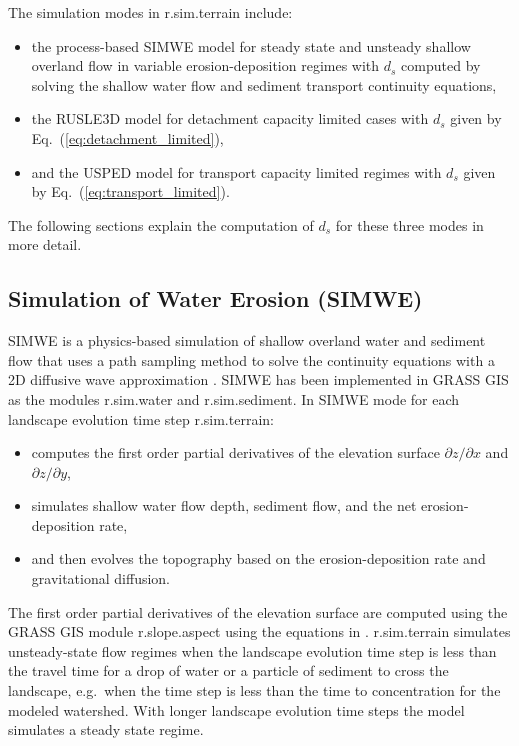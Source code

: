\documentclass[gmd, manuscript]{copernicus}
\begin{document}
The simulation modes in r.sim.terrain include:
\begin{itemize}
  \item the process-based SIMWE model 
  for steady state and unsteady shallow overland flow 
  in variable erosion-deposition regimes
  with $d_s$ computed by solving the shallow water flow 
  and sediment transport continuity equations,
  \item the RUSLE3D model for detachment capacity limited cases
  with $d_s$ given by Eq.~(\ref{eq:detachment_limited}),
  \item and the USPED model for transport capacity limited regimes
  with $d_s$ given by Eq.~(\ref{eq:transport_limited}).
\end{itemize}

\noindent The following sections explain the computation of $d_s$ for these three modes in more detail.

\subsection{Simulation of Water Erosion (SIMWE)} \label{simwe}
SIMWE is a physics-based simulation of shallow overland water and sediment flow
that uses a path sampling method to solve the continuity equations 
with a 2D diffusive wave approximation 
\citep{Mitas1998,Mitasova2004}.
SIMWE has been implemented in GRASS GIS as the modules 
r.sim.water
and r.sim.sediment. 
In SIMWE mode for each landscape evolution time step
r.sim.terrain:
\begin{itemize}
\item computes the first order partial derivatives of the elevation surface
$\partial z / \partial x$ and $\partial z / \partial y$,
\item simulates shallow water flow depth, sediment flow, and the net erosion-deposition rate, 
\item and then evolves the topography based on the erosion-deposition rate and gravitational diffusion. 
\end{itemize}
%
The first order partial derivatives of the elevation surface
are computed using the GRASS GIS module r.slope.aspect 
using the equations in \cite{Hofierka2009}.
r.sim.terrain simulates unsteady-state flow regimes
when the landscape evolution time step is less than the travel time 
for a drop of water or a particle of sediment to cross the landscape,
e.g.~when the time step is less than the 
time to concentration for the modeled watershed.
With longer landscape evolution time steps 
the model simulates a steady state regime. 
\end{document}
